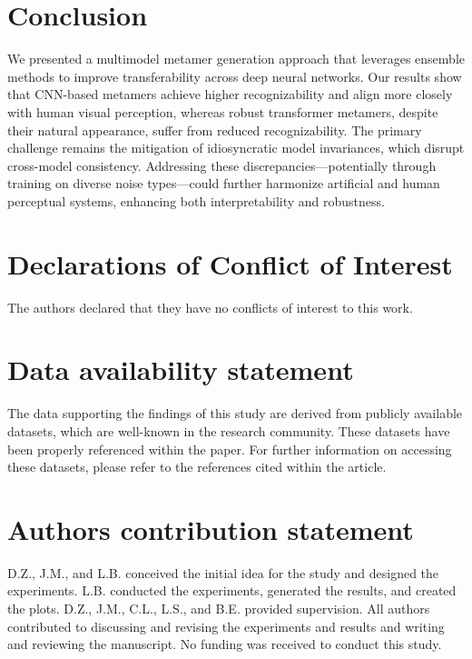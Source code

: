 \documentclass[pdflatex,sn-mathphys-num]{sn-jnl}%
\theoremstyle{thmstyleone}%
\theoremstyle{thmstyletwo}%
\theoremstyle{thmstylethree}%
\begin{document}
\section{Conclusion}

We presented a multimodel metamer generation approach that leverages ensemble methods to improve transferability across deep neural networks. Our results show that CNN-based metamers achieve higher recognizability and align more closely with human visual perception, whereas robust transformer metamers, despite their natural appearance, suffer from reduced recognizability. The primary challenge remains the mitigation of idiosyncratic model invariances, which disrupt cross-model consistency. Addressing these discrepancies—potentially through training on diverse noise types—could further harmonize artificial and human perceptual systems, enhancing both interpretability and robustness.


\section*{Declarations of Conflict of Interest}

The authors declared that they have no conflicts of interest to this work.

\section*{Data availability statement}
The data supporting the findings of this study are derived from publicly available datasets, which are well-known in the research community. These datasets have been properly referenced within the paper. For further information on accessing these datasets, please refer to the references cited within the article.

\section*{Authors contribution statement}
D.Z., J.M., and L.B. conceived the initial idea for the study and designed the experiments. L.B. conducted the experiments, generated the results, and created the plots. D.Z., J.M., C.L., L.S., and B.E. provided supervision. All authors contributed to discussing and revising the experiments and results and writing and reviewing the manuscript. No funding was received to conduct this study.
\end{document}
